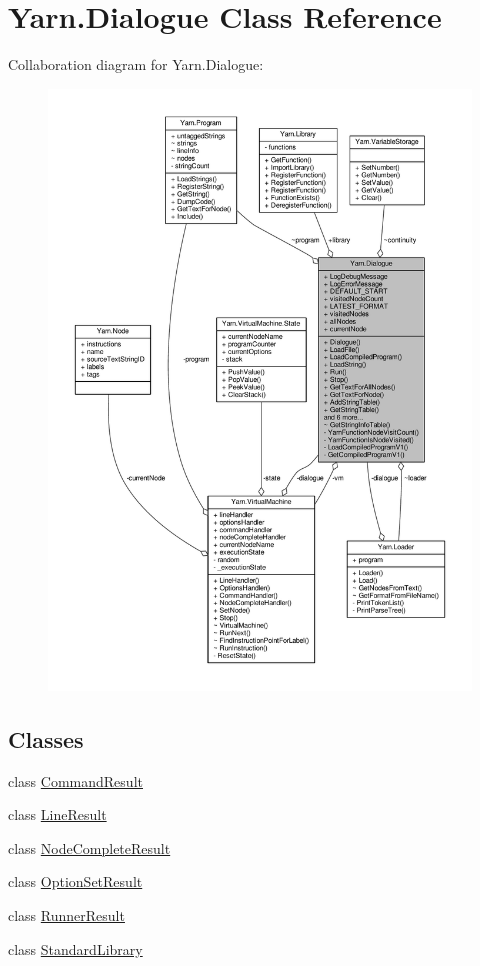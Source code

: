 \hypertarget{a00070}{\section{Yarn.\-Dialogue Class Reference}
\label{a00070}
}


Collaboration diagram for Yarn.\-Dialogue\-:
\nopagebreak
\begin{figure}[H]
\begin{center}
\leavevmode
\includegraphics[width=350pt]{d4/d79/a00540}
\end{center}
\end{figure}
\subsection*{Classes}
\begin{DoxyCompactItemize}
\item 
class \hyperlink{a00030}{Command\-Result}
\item 
class \hyperlink{a00104}{Line\-Result}
\item 
class \hyperlink{a00111}{Node\-Complete\-Result}
\item 
class \hyperlink{a00117}{Option\-Set\-Result}
\item 
class \hyperlink{a00130}{Runner\-Result}
\item 
class \hyperlink{a00138}{Standard\-Library}
\end{DoxyCompactItemize}
